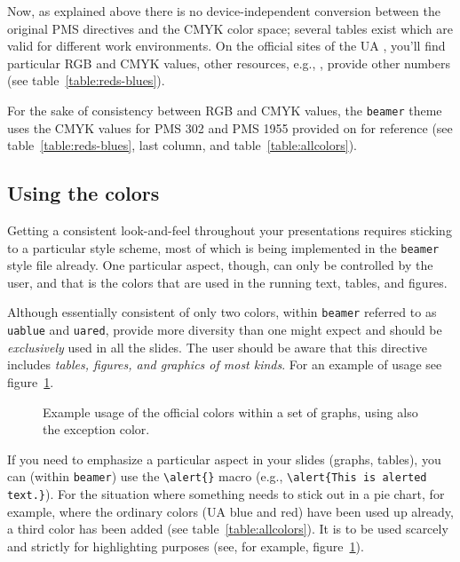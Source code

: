 Now, as explained above there is no device-independent conversion between the
original PMS directives and the CMYK color space; several tables exist which
are valid for different work environments. On the official sites of the UA
\cite{KAN::}, you'll find particular RGB and CMYK values, other resources,
e.g., \cite{::TDC}, provide other numbers (see table~\ref{table:reds-blues}).

For the sake of consistency between RGB and CMYK values, the \texttt{beamer}
theme uses the CMYK values for PMS 302 and PMS 1955 provided on \cite{::TDC}
for reference (see table~\ref{table:reds-blues}, last column, and
table~\ref{table:allcolors}).


\subsection{Using the colors}\label{subsection:usingthecolors}

Getting a consistent look-and-feel throughout your presentations requires
sticking to a particular style scheme, most of which is being implemented in
the \texttt{beamer} style file already. One particular aspect, though, can only
be controlled by the user, and that is the colors that are used in the running
text, tables, and figures.

Although essentially consistent of only two colors, within \texttt{beamer}
referred to as \lstinline!uablue! and \lstinline!uared!, provide more diversity
than one might expect and should be  \emph{exclusively} used  in all the
slides. The user should be aware that this directive includes \emph{tables,
figures, and graphics of most kinds}. For an example of usage see
figure~\ref{fig:coloredgraphs}.

\begin{figure}
\setlength{\figurewidth}{10cm}
\setlength{\figureheight}{5cm}
\centering

\caption{Example usage of the official colors within a set of graphs, using
also the exception color.}
\label{fig:coloredgraphs}
\end{figure}

If you need to emphasize a particular aspect in your slides (graphs, tables),
you can (within \texttt{beamer}) use the \lstinline!\alert{}! macro (e.g.,
\lstinline!\alert{This is alerted text.}!). For the situation where something
needs to stick out in a pie chart, for example, where the ordinary colors (UA
blue and red) have been used up already, a third color has been added (see
table~\ref{table:allcolors}). It is to be used scarcely and strictly for
highlighting purposes (see, for example, figure~\ref{fig:coloredgraphs}).


